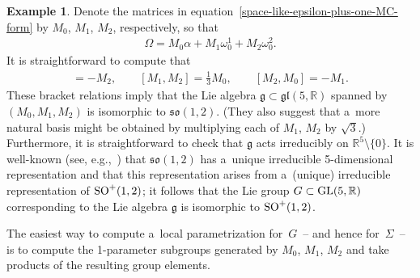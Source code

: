 \documentclass[pdftex]{sigma}
\numberwithin{equation}{section}
\theoremstyle{definition}
\newtheorem{exmpl}[teo]{Example}
\begin{document}
\begin{exmpl}
Denote the matrices in equation~\eqref{space-like-epsilon-plus-one-MC-form} by $M_0$, $M_1$, $M_2$, respectively, so that
\begin{gather*}
\Omega = M_0  \alpha + M_1  \omega^1_0 + M_2  \omega^2_0.
\end{gather*}
It is straightforward to compute that
\begin{gather*}
[M_0, M_1] = -M_2,
\qquad
[M_1, M_2] = \tfrac{1}{3} M_0,
\qquad
[M_2, M_0] = -M_1.
\end{gather*}
These bracket relations imply that the Lie algebra $\mathfrak{g} \subset \mathfrak{gl}(5,\mathbb{R})$ spanned by $(M_0,
M_1, M_2)$ is isomorphic to $\mathfrak{so}(1,2)$.
(They also suggest that a~more natural basis might be obtained by multiplying each of $M_1$, $M_2$ by $\sqrt{3}$.)
Furthermore, it is straightforward to check that $\mathfrak{g}$ acts irreducibly on $\mathbb{R}^5 \setminus \{0 \}$.
It is well-known (see, e.g.,~\cite[p.~149]{FultonHarris}) that $\mathfrak{so}(1,2)$ has a~unique irreducible
5-dimensional representation and that this representation arises from a~(unique) irreducible representation of ${\rm
SO}^+(1,2)$; it follows that the Lie group $G \subset {\rm GL}(5,\mathbb{R})$ corresponding to the Lie algebra
$\mathfrak{g}$ is isomorphic to ${\rm SO}^+(1,2)$.

The easiest way to compute a~local parametrization for~$G$~-- and hence for~$\Sigma$~-- is to compute the 1-parameter
subgroups generated by $M_0$, $M_1$, $M_2$ and take products of the resulting group elements.


\end{exmpl}
\end{document}
